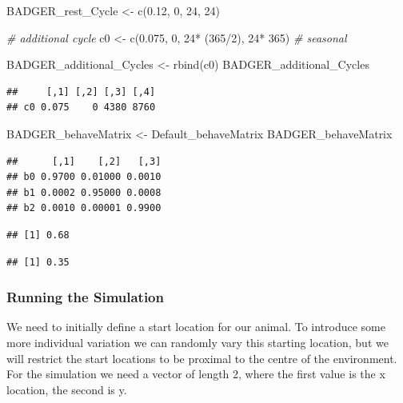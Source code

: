 \documentclass[10pt,a4paper]{article}
\newenvironment{Shaded}{}{}
\newcommand{\CommentTok}[1]{\textit{#1}}
\newcommand{\DecValTok}[1]{#1}
\newcommand{\FloatTok}[1]{#1}
\newcommand{\FunctionTok}[1]{#1}
\newcommand{\NormalTok}[1]{#1}
\newcommand{\OtherTok}[1]{#1}
\newcommand{\SpecialCharTok}[1]{#1}
\begin{document}
\begin{Shaded}
\begin{Highlighting}[]
\NormalTok{BADGER\_rest\_Cycle }\OtherTok{\textless{}{-}} \FunctionTok{c}\NormalTok{(}\FloatTok{0.12}\NormalTok{, }\DecValTok{0}\NormalTok{, }\DecValTok{24}\NormalTok{, }\DecValTok{24}\NormalTok{)}

\CommentTok{\# additional cycle}
\NormalTok{c0 }\OtherTok{\textless{}{-}} \FunctionTok{c}\NormalTok{(}\FloatTok{0.075}\NormalTok{, }\DecValTok{0}\NormalTok{, }\DecValTok{24}\SpecialCharTok{*}\NormalTok{ (}\DecValTok{365}\SpecialCharTok{/}\DecValTok{2}\NormalTok{), }\DecValTok{24}\SpecialCharTok{*} \DecValTok{365}\NormalTok{) }\CommentTok{\# seasonal}

\NormalTok{BADGER\_additional\_Cycles }\OtherTok{\textless{}{-}} \FunctionTok{rbind}\NormalTok{(c0)}
\NormalTok{BADGER\_additional\_Cycles}
\end{Highlighting}
\end{Shaded}

\begin{verbatim}
##     [,1] [,2] [,3] [,4]
## c0 0.075    0 4380 8760
\end{verbatim}

\begin{Shaded}
\begin{Highlighting}[]
\NormalTok{BADGER\_behaveMatrix }\OtherTok{\textless{}{-}}\NormalTok{ Default\_behaveMatrix}
\NormalTok{BADGER\_behaveMatrix}
\end{Highlighting}
\end{Shaded}

\begin{verbatim}
##      [,1]    [,2]   [,3]
## b0 0.9700 0.01000 0.0010
## b1 0.0002 0.95000 0.0008
## b2 0.0010 0.00001 0.9900
\end{verbatim}

\begin{verbatim}
## [1] 0.68
\end{verbatim}

\begin{verbatim}
## [1] 0.35
\end{verbatim}

\hypertarget{running-the-simulation}{%
\subsubsection{Running the Simulation}\label{running-the-simulation}}

We need to initially define a start location for our animal.
To introduce some more individual variation we can randomly vary this starting location, but we will restrict the start locations to be proximal to the centre of the environment.
For the simulation we need a vector of length 2, where the first value is the x location, the second is y.
\end{document}
